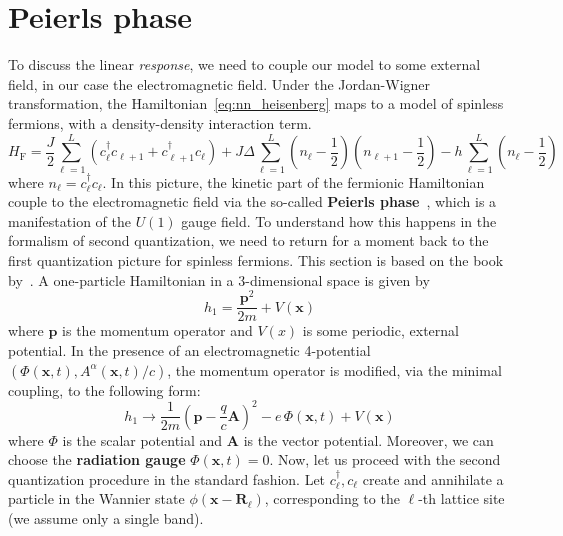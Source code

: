 \section{Peierls phase}
To discuss the linear \textit{response}, we need to couple our model to some external field, in our
case the electromagnetic field. Under the Jordan-Wigner transformation, the Hamiltonian~\eqref{eq:nn_heisenberg}
maps to a model of spinless fermions, with a density-density interaction term.
\begin{equation}
    H_{\text{F} } = \frac{J}{2}\sum_{\ell=1}^{L} \left( c_{\ell}^{\dagger} c_{\ell+1} + c_{\ell+1}^{\dagger} c_{\ell} \right)
    + J \Delta \sum_{\ell=1}^{L} \left(n_{\ell} - \frac{1}{2}\right)\left(n_{\ell+1}-\frac{1}{2}\right)
    - h \sum_{\ell=1}^{L} \left(n_{\ell} - \frac{1}{2}\right)
\end{equation}
where \(n_{\ell} = c^{\dag}_{\ell}c_{\ell}\).
In this picture, the kinetic part of the fermionic Hamiltonian couple to the electromagnetic field
via the so-called \textbf{Peierls phase}~\autocite{Peierls1933,Luttinger1951,Kohn1959,Blount1962,Wannier1962}, which is a manifestation of the \(U(1)\) gauge field. To understand
how this happens in the formalism of second quantization, we need to return for a moment back to the
first quantization picture for spinless fermions. This section is based on the book by~\textcite{Essler2005}.
A one-particle Hamiltonian in a 3-dimensional space is given by
\begin{equation}
    h_{1} = \frac{\mathbf{p}^{2}}{2m} + V(\mathbf{x} )
\end{equation}
where \(\mathbf{p}\) is the momentum operator and \(V(x)\) is some periodic, external potential. In the presence of an
electromagnetic 4-potential \(\left(\Phi(\mathbf{x},t ), A^{\alpha }(\mathbf{x} ,t)/c\right)\),
the momentum operator is modified, via the minimal coupling, to the following form:
\begin{equation}
    h_{1} \to \frac{1}{2m}\left(\mathbf{p} - \frac{q}{c}\mathbf{A}\right)^{2} - e\,\Phi(\mathbf{x},t) + V(\mathbf{x} )
\end{equation}
where \(\Phi \) is the scalar potential and \(\mathbf{A}\) is the vector potential.
Moreover, we can choose the \textbf{radiation gauge} \(\Phi(\mathbf{x} ,t) = 0\).
Now, let us proceed with the second quantization procedure in the standard fashion. Let
\(c^{\dag}_{\ell},c_{\ell}\) create and annihilate a particle in the Wannier state \(\phi(\mathbf{x - \mathbf{R}_{\ell}})\),
corresponding to the \(\ell\)-th lattice site (we assume only a single band).
